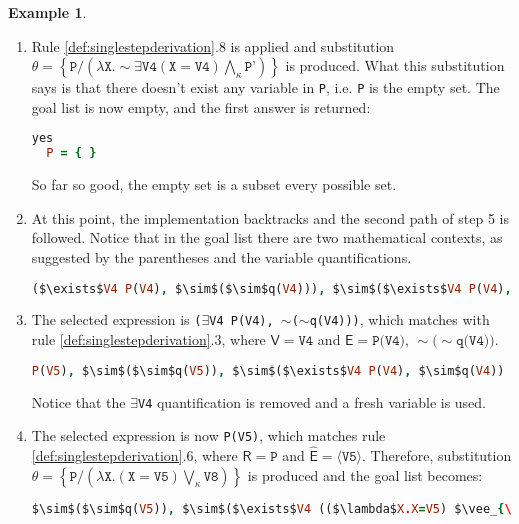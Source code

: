 \documentclass[inscr,ack,preface]{dithesis}
\theoremstyle{definition}
\newtheorem{example}{Example}[chapter]
\newcommand{\msf}[1]{$\mathsf{#1}$}
\begin{document}
\begin{example}
\begin{enumerate}
\item Rule \ref{def:singlestepderivation}.8 is applied and substitution \msf{\theta=\left\{ \texttt{P} / \left( \lambda \texttt{X}. \sim\exists \texttt{V4} ( \texttt{X} = \texttt{V4}) \bigwedge_{\kappa} \texttt{P'} \right) \right\}} is produced. What this substitution says is that there doesn't exist any variable in \texttt{P}, i.e. \texttt{P} is the empty set. The goal list is now empty, and the first answer is returned:
\begin{lstlisting}[language=Prolog,%
  frame=single,breaklines=false,mathescape=true]
  yes
  P = { }
\end{lstlisting}
So far so good, the empty set is a subset every possible set.

\item At this point, the implementation backtracks and the second path of step 5 is followed. Notice that in the goal list there are two mathematical contexts, as suggested by the parentheses and the variable quantifications.
\begin{lstlisting}[language=Prolog,%
  frame=single,breaklines=false,mathescape=true]
  ($\exists$V4 P(V4), $\sim$($\sim$q(V4))), $\sim$($\exists$V4 P(V4), $\sim$q(V4)) ?
\end{lstlisting}

\item The selected expression is \texttt{($\exists$V4 P(V4), $\sim$($\sim$q(V4)))}, which matches with rule \ref{def:singlestepderivation}.3, where \msf{V = \texttt{V4}} and \msf{E = \texttt{P(V4), $\sim$($\sim$q(V4))}}.
\begin{lstlisting}[language=Prolog,%
  frame=single,breaklines=false,mathescape=true]
  P(V5), $\sim$($\sim$q(V5)), $\sim$($\exists$V4 P(V4), $\sim$q(V4)) ?
\end{lstlisting}
Notice that the \texttt{$\exists$V4} quantification is removed and a fresh variable is used.

\item The selected expression is now \texttt{P(V5)}, which matches rule \ref{def:singlestepderivation}.6, where \msf{R = \texttt{P}} and \msf{\widehat{E} = \langle \texttt{V5} \rangle}.
Therefore, substitution \msf{\theta = \left\{ \texttt{P} / \left( \lambda \texttt{X}. (\texttt{X} = \texttt{V5}) \bigvee_{\kappa} \texttt{V8} \right) \right\}} is produced and the goal list becomes:
\begin{lstlisting}[language=Prolog,%
  frame=single,breaklines=false,mathescape=true]
  $\sim$($\sim$q(V5)), $\sim$($\exists$V4 (($\lambda$X.X=V5) $\vee_{\kappa}$ V8)(V4), $\sim$q(V4)) ?
\end{lstlisting}


\end{enumerate}
\end{example}
\end{document}
